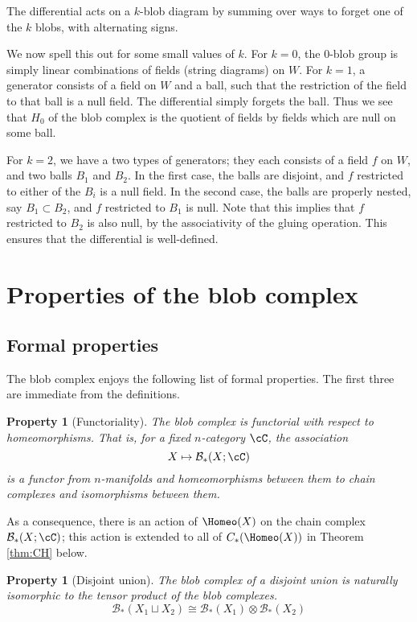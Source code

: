\documentclass{pnastwo}
\def\bc{{\mathcal B}}
\newcommand{\iso}{\cong}
\newcommand{\tensor}{\otimes}
\def\du{\sqcup}
\newtheorem{property}[prop]{Property}
\begin{document}
\begin{article}
The differential acts on a $k$-blob diagram by summing over ways to forget one of the $k$ blobs, with alternating signs.

We now spell this out for some small values of $k$. 
For $k=0$, the $0$-blob group is simply linear combinations of fields (string diagrams) on $W$. 
For $k=1$, a generator consists of a field on $W$ and a ball, such that the restriction of the field to that ball is a null field. 
The differential simply forgets the ball. 
Thus we see that $H_0$ of the blob complex is the quotient of fields by fields which are null on some ball.

For $k=2$, we have a two types of generators; they each consists of a field $f$ on $W$, and two balls $B_1$ and $B_2$. 
In the first case, the balls are disjoint, and $f$ restricted to either of the $B_i$ is a null field. 
In the second case, the balls are properly nested, say $B_1 \subset B_2$, and $f$ restricted to $B_1$ is null. 
Note that this implies that $f$ restricted to $B_2$ is also null, by the associativity of the gluing operation. 
This ensures that the differential is well-defined.

\section{Properties of the blob complex}
\subsection{Formal properties}
\label{sec:properties}
The blob complex enjoys the following list of formal properties. The first three are immediate from the definitions.

\begin{property}[Functoriality]
\label{property:functoriality}%
The blob complex is functorial with respect to homeomorphisms.
That is, 
for a fixed $n$-category $\cC$, the association
\begin{equation*}
X \mapsto \bc_*(X; \cC)
\end{equation*}
is a functor from $n$-manifolds and homeomorphisms between them to chain 
complexes and isomorphisms between them.
\end{property}
As a consequence, there is an action of $\Homeo(X)$ on the chain complex $\bc_*(X; \cC)$; 
this action is extended to all of $C_*(\Homeo(X))$ in Theorem \ref{thm:CH} below.

\begin{property}[Disjoint union]
\label{property:disjoint-union}
The blob complex of a disjoint union is naturally isomorphic to the tensor product of the blob complexes.
\begin{equation*}
\bc_*(X_1 \du X_2) \iso \bc_*(X_1) \tensor \bc_*(X_2)
\end{equation*}
\end{property}


\end{article}
\end{document}
